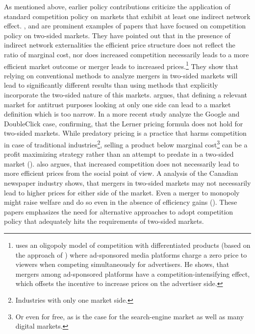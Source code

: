 \documentclass[10pt,a4paper]{scrreprt}
\begin{document}
As mentioned above, earlier policy contributions criticize the application of standard competition policy on markets that exhibit at least one indirect network effect. \cite{evans_antitrust_2003}, \cite{evans_industrial_2007} \cite{wright_one-sided_2004} and \cite{kaiser_price_2006} are prominent examples of papers that have focused on competition policy on two-sided markets. They have pointed out that in the presence of indirect network externalities the efficient price structure does not reflect the ratio of marginal cost, nor does increased competition necessarily leads to a more efficient market outcome or merger leads to increased prices.\footnote{\cite{malam_mergers_2011} uses an oligopoly model of competition with differentiated products (based on the approach of \cite{salop_monopolistic_1979}) where ad-sponsored media platforms charge a zero price to viewers when competing simultaneously for advertisers. He shows, that mergers among ad-sponsored platforms have a competition-intensifying effect, which offsets the incentive to increase prices on the advertiser side.} They show that relying on conventional methods to analyze mergers in two-sided markets will lead to significantly different results than using methods that explicitly incorporate the two-sided nature of this markets. \cite{evans_antitrust_2003} argues, that defining a relevant market for antitrust purposes looking at only one side can lead to a market definition which is too narrow. In a more recent study \cite{evans_analysis_2008} analyze the Google and DoubleClick case, confirming, that the Lerner pricing formula does not hold for two-sided markets. While predatory pricing is a practice that harms competition in case of traditional industries\footnote{Industries with only one market side.}, selling a product below marginal cost\footnote{Or even for free, as is the case for the search-engine market as well as many digital markets.} can be a profit maximizing strategy rather than an attempt to predate in a two-sided market (\cite{wright_one-sided_2004}). \cite{wright_one-sided_2004} also argues, that increased competition does not necessarily lead to more efficient prices from the social point of view. A analysis of the Canadian newspaper industry shows, that mergers in two-sided markets may not necessarily lead to higher prices for either side of the market. Even a merger to monopoly might raise welfare and do so even in the absence of efficiency gains (\cite{leonello_horizontal_2010}). These papers emphasizes  the need for alternative approaches to adopt competition policy that adequately hits the requirements of two-sided markets. 
\end{document}
